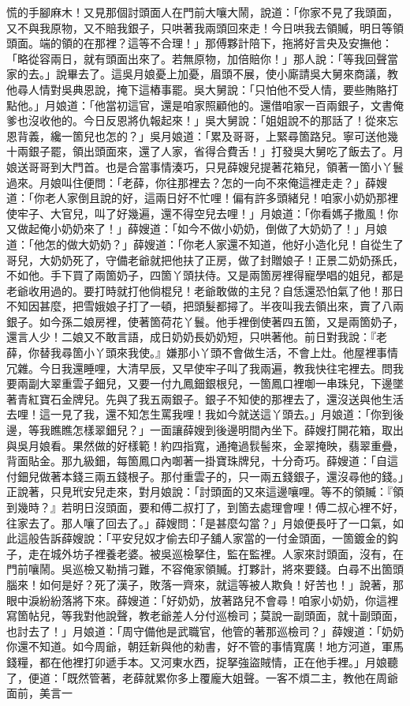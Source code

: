 \begin{showcontents}{}
慌的手腳麻木！又見那個討頭面人在門前大嚷大鬧，說道：「你家不見了我頭面，又不與我原物，又不賠我銀子，只哄著我兩頭回來走！今日哄我去領贓，明日等領頭面。端的領的在那裡？這等不合理！」那傅夥計陪下，拖將好言央及安撫他：「略從容兩日，就有頭面出來了。若無原物，加倍賠你！」那人說：「等我回聲當家的去。」說畢去了。這吳月娘憂上加憂，眉頭不展，使小廝請吳大舅來商議，教他尋人情對吳典恩說，掩下這樁事罷。吳大舅說：「只怕他不受人情，要些賄賂打點他。」月娘道：「他當初這官，還是咱家照顧他的。還借咱家一百兩銀子，文書俺爹也沒收他的。今日反恩將仇報起來！」吳大舅說：「姐姐說不的那話了！從來忘恩背義，纔一箇兒也怎的？」吳月娘道：「累及哥哥，上緊尋箇路兒。寧可送他幾十兩銀子罷，領出頭面來，還了人家，省得合費舌！」打發吳大舅吃了飯去了。月娘送哥哥到大門首。也是合當事情湊巧，只見薛嫂兒提著花箱兒，領著一箇小丫鬟過來。月娘叫住便問：「老薛，你往那裡去？怎的一向不來俺這裡走走？」薛嫂道：「你老人家倒且說的好，這兩日好不忙哩！偏有許多頭緒兒！咱家小奶奶那裡使牢子、大官兒，叫了好幾遍，還不得空兒去哩！」月娘道：「你看媽子撒風！你又做起俺小奶奶來了！」薛嫂道：「如今不做小奶奶，倒做了大奶奶了！」月娘道：「他怎的做大奶奶？」薛嫂道：「你老人家還不知道，他好小造化兒！自從生了哥兒，大奶奶死了，守備老爺就把他扶了正房，做了封贈娘子！正景二奶奶孫氏，不如他。手下買了兩箇奶子，四箇丫頭扶侍。又是兩箇房裡得寵學唱的姐兒，都是老爺收用過的。要打時就打他倘棍兒！老爺敢做的主兒？自恁還恐怕氣了他！那日不知因甚麼，把雪娥娘子打了一頓，把頭髮都撏了。半夜叫我去領出來，賣了八兩銀子。如今孫二娘房裡，使著箇荷花丫鬟。他手裡倒使著四五箇，又是兩箇奶子，還言人少！二娘又不敢言語，成日奶奶長奶奶短，只哄著他。前日對我說：『老薛，你替我尋箇小丫頭來我使。』嫌那小丫頭不會做生活，不會上灶。他屋裡事情冗雜。今日我還睡哩，大清早辰，又早使牢子叫了我兩遍，教我快往宅裡去。問我要兩副大翠重雲子鈿兒，又要一付九鳳鈿銀根兒，一箇鳳口裡啣一串珠兒，下邊墜著青紅寶石金牌兒。先與了我五兩銀子。銀子不知使的那裡去了，還沒送與他生活去哩！這一見了我，還不知怎生罵我哩！我如今就送這丫頭去。」月娘道：「你到後邊，等我瞧瞧怎樣翠鈿兒？」一面讓薛嫂到後邊明間內坐下。薛嫂打開花箱，取出與吳月娘看。果然做的好樣範！約四指寬，通掩過䯼髻來，金翠掩映，翡翠重疊，背面貼金。那九級鈿，每箇鳳口內啣著一掛寶珠牌兒，十分奇巧。薛嫂道：「自這付鈿兒做著本錢三兩五錢根子。那付重雲子的，只一兩五錢銀子，還沒尋他的錢。」正說著，只見玳安兒走來，對月娘說：「討頭面的又來這邊嚷哩。等不的領贓：『領到幾時？』若明日沒頭面，要和傅二叔打了，到箇去處理會哩！傅二叔心裡不好，往家去了。那人嚷了回去了。」薛嫂問：「是甚麼勾當？」月娘便長吁了一口氣，如此這般告訴薛嫂說：「平安兒奴才偷去印子舖人家當的一付金頭面，一箇鍍金的鈎子，走在城外坊子裡養老婆。被吳巡檢拏住，監在監裡。人家來討頭面，沒有，在門前嚷鬧。吳巡檢又勒掯刁難，不容俺家領贓。打夥計，將來要錢。白尋不出箇頭腦來！如何是好？死了漢子，敗落一齊來，就這等被人欺負！好苦也！」說著，那眼中淚紛紛落將下來。薛嫂道：「好奶奶，放著路兒不會尋！咱家小奶奶，你這裡寫箇帖兒，等我對他說聲，教老爺差人分付巡檢司；莫說一副頭面，就十副頭面，也討去了！」月娘道：「周守備他是武職官，他管的著那巡檢司？」薛嫂道：「奶奶你還不知道。如今周爺，朝廷新與他的勑書，好不管的事情寬廣！地方河道，軍馬錢糧，都在他裡打卯遞手本。又河東水西，捉拏強盜賊情，正在他手裡。」月娘聽了，便道：「既然管著，老薛就累你多上覆龐大姐聲。一客不煩二主，教他在周爺面前，美言一
\end{showcontents}
